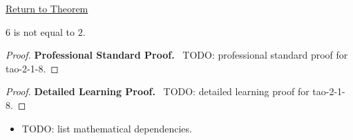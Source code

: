 \newpage
{}
\label{prf:tao-2-1-8}

\begin{remark*}[Return]
\hyperref[prop:tao-2-1-8]{Return to Theorem}
\end{remark*}

\begin{theorem*}
$6$ is not equal to $2$.
\end{theorem*}

\begin{proof}
\textbf{Professional Standard Proof.}~
TODO: professional standard proof for tao-2-1-8.
\end{proof}

\begin{proof}
\textbf{Detailed Learning Proof.}~
TODO: detailed learning proof for tao-2-1-8.
\end{proof}

\begin{remark*}
\end{remark*}

\begin{dependencies}
\begin{itemize}
  \item TODO: list mathematical dependencies.
\end{itemize}
\end{dependencies}

\clearpage
